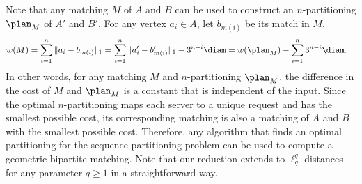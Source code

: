 Note that any matching $M$ of $A$ and $B$ can be used to construct an $n$-partitioning $\plan_M$ of $A'$ and $B'$. For any vertex $a_i \in A$, let $b_{m(i)}$ be its match in $M$. 
\begin{align}
    w(M)& = \sum_{i=1}^n \|a_i-b_{m(i)}\|_1=  \sum_{i=1}^n \|a_i'-b_{m(i)}'\|_1 -  3^{n-i}\diam = w(\plan_M)-\sum_{i=1}^n 3^{n-i}\diam.\label{eq:matching-EBM}
\end{align}
In other words, for any matching $M$ and $n$-partitioning $\plan_M$, the difference in the cost of $M$ and $\plan_M$ is a constant that is independent of the input. Since the optimal $n$-partitioning maps each server to a unique request and has the smallest possible cost, its corresponding matching is also a matching of $A$ and $B$ with the smallest possible cost.   
Therefore, any algorithm that finds an optimal partitioning for the sequence partitioning problem can be used to compute a geometric bipartite matching.
Note that our reduction extends to $\ell_q^q$ distances for any parameter $q\ge 1$ in a straightforward way. 


